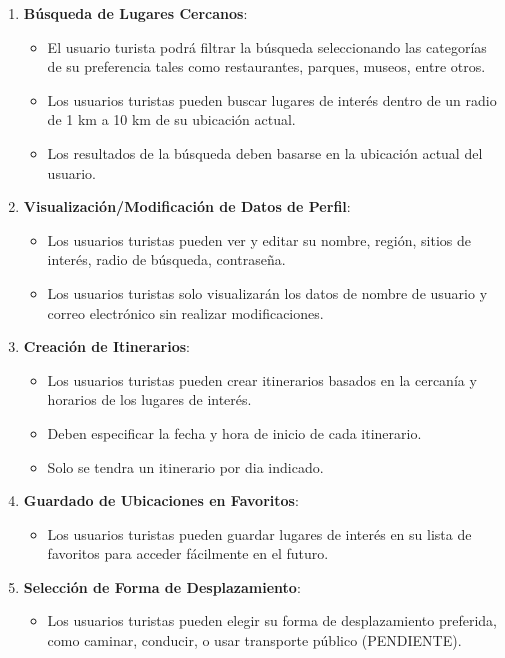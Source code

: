 \documentclass{article}
\begin{document}
\begin{enumerate}
    \item \textbf{Búsqueda de Lugares Cercanos}:
    \begin{itemize}
        \item El usuario turista podrá filtrar la búsqueda seleccionando las categorías de su preferencia tales como restaurantes, parques, museos, entre otros.
        \item Los usuarios turistas pueden buscar lugares de interés dentro de un radio de 1 km a 10 km de su ubicación actual.
        \item Los resultados de la búsqueda deben basarse en la ubicación actual del usuario.
    \end{itemize}
    

    
    \item \textbf{Visualización/Modificación de Datos de Perfil}:
    \begin{itemize}
        \item Los usuarios turistas pueden ver y editar su nombre, región, sitios de interés, radio de búsqueda, contraseña.
        \item Los usuarios turistas solo visualizarán los datos de nombre de usuario y correo electrónico sin realizar modificaciones.
    \end{itemize}

    \item \textbf{Creación de Itinerarios}:
    \begin{itemize}
        \item Los usuarios turistas pueden crear itinerarios basados en la cercanía y horarios de los lugares de interés.
        \item Deben especificar la fecha y hora de inicio de cada itinerario.
        \item Solo se tendra un itinerario por dia indicado.
    \end{itemize}
    
    \item \textbf{Guardado de Ubicaciones en Favoritos}:
    \begin{itemize}
        \item Los usuarios turistas pueden guardar lugares de interés en su lista de favoritos para acceder fácilmente en el futuro.
    \end{itemize}
    
    \item \textbf{Selección de Forma de Desplazamiento}:
    \begin{itemize}
        \item Los usuarios turistas pueden elegir su forma de desplazamiento preferida, como caminar, conducir, o usar transporte público (PENDIENTE).
    \end{itemize}
    

\end{enumerate}
\end{document}
